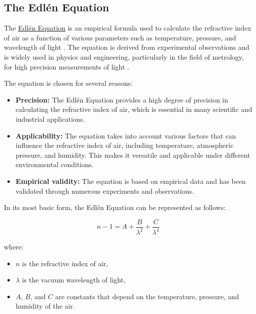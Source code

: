 \documentclass[12pt, twoside]{report}
\begin{document}
\subsection{The Edlén Equation}

The \href{https://web.archive.org/web/20230608180923/https://emtoolbox.nist.gov/Wavelength/Documentation.asp}{Edlén Equation} is an empirical formula used to calculate the refractive index of air as a function of various parameters such as temperature, pressure, and wavelength of light \cite{Edln1953}. The equation is derived from experimental observations and is widely used in physics and engineering, particularly in the field of metrology, for high precision measurements of light \cite{Edln1966} \cite{Birch1993}.

\vspace{1em}
The equation is chosen for several reasons:

\begin{itemize}
\item \textbf{Precision:} The Edlén Equation provides a high degree of precision in calculating the refractive index of air, which is essential in many scientific and industrial applications.
\item \textbf{Applicability:} The equation takes into account various factors that can influence the refractive index of air, including temperature, atmospheric pressure, and humidity. This makes it versatile and applicable under different environmental conditions.
\item \textbf{Empirical validity:} The equation is based on empirical data and has been validated through numerous experiments and observations.
\end{itemize}

In its most basic form, the Edlén Equation can be represented as follows:

\begin{equation}
n - 1 = A + \frac{B}{\lambda^2} + \frac{C}{\lambda^4}
\end{equation}

where:

\begin{itemize}
\item $n$ is the refractive index of air,
\item $\lambda$ is the vacuum wavelength of light,
\item $A$, $B$, and $C$ are constants that depend on the temperature, pressure, and humidity of the air.
\end{itemize}
\end{document}
